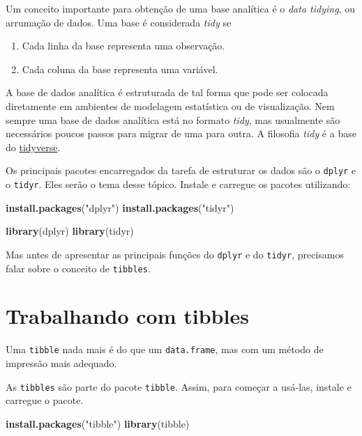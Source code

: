 \documentclass[
]{book}
\newenvironment{Shaded}{\begin{snugshade}}{\end{snugshade}}
\newcommand{\KeywordTok}[1]{\textcolor[rgb]{0.13,0.29,0.53}{\textbf{#1}}}
\newcommand{\NormalTok}[1]{#1}
\newcommand{\StringTok}[1]{\textcolor[rgb]{0.31,0.60,0.02}{#1}}
\providecommand{\tightlist}{%
  \setlength{\itemsep}{0pt}\setlength{\parskip}{0pt}}
\begin{document}
Um conceito importante para obtenção de uma base analítica é o \emph{data tidying}, ou arrumação de dados. Uma base é considerada \emph{tidy} se

\begin{enumerate}
\def\labelenumi{\arabic{enumi}.}
\tightlist
\item
  Cada linha da base representa uma observação.
\item
  Cada coluna da base representa uma variável.
\end{enumerate}

A base de dados analítica é estruturada de tal forma que pode ser colocada diretamente em ambientes de modelagem estatística ou de visualização. Nem sempre uma base de dados analítica está no formato \emph{tidy}, mas usualmente são necessários poucos passos para migrar de uma para outra. A filosofia \emph{tidy} é a base do \href{https://www.tidyverse.org/}{tidyverse}.

Os principais pacotes encarregados da tarefa de estruturar os dados são o \texttt{dplyr} e o \texttt{tidyr}. Eles serão o tema desse tópico. Instale e carregue os pacotes utilizando:

\begin{Shaded}
\begin{Highlighting}[]
\KeywordTok{install.packages}\NormalTok{(}\StringTok{"dplyr"}\NormalTok{)}
\KeywordTok{install.packages}\NormalTok{(}\StringTok{"tidyr"}\NormalTok{)}

\KeywordTok{library}\NormalTok{(dplyr)}
\KeywordTok{library}\NormalTok{(tidyr)}
\end{Highlighting}
\end{Shaded}

Mas antes de apresentar as principais funções do \texttt{dplyr} e do \texttt{tidyr}, precisamos falar sobre o conceito de \texttt{tibbles}.

\hypertarget{trabalhando-com-tibbles}{%
\section{Trabalhando com tibbles}\label{trabalhando-com-tibbles}}

Uma \texttt{tibble} nada mais é do que um \texttt{data.frame}, mas com um método de impressão mais adequado.

As \texttt{tibbles} são parte do pacote \texttt{tibble}. Assim, para começar a usá-las, instale e carregue o pacote.

\begin{Shaded}
\begin{Highlighting}[]
\KeywordTok{install.packages}\NormalTok{(}\StringTok{"tibble"}\NormalTok{)}
\KeywordTok{library}\NormalTok{(tibble)}
\end{Highlighting}
\end{Shaded}
\end{document}
